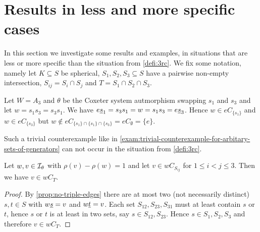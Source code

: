 \section{Results in less and more specific cases}
\label{sec:sec:main-thesis-less-more-specific}

%
%		

In this section we investigate some results and examples, in situations that are less or more specific than the situation from \ref{defi:3rc}. We fix some notation, namely let $K \subseteq S$ be spherical, $S_1,S_2,S_3 \subseteq S$ have a pairwise non-empty intersection, $S_{ij} = S_i \cap S_j$ and $T = S_1 \cap S_2 \cap S_3$.

\begin{exam}
	Let $W = A_3$ and $\theta$ be the Coxeter system autmorphism swapping $s_1$ and $s_3$ and let $w = s_1s_3 = s_3s_1$. We have $e \underline{s}_1 = s_3 s_1 = w = s_1 s_3 = e \underline{s}_3$. Hence $w \in eC_{\{s_1\}}$ and $w \in eC_{\{s_3\}}$ but $w \notin eC_{\{s_1\} \cap \{s_1\} \cap \{s_3\}} = eC_\emptyset = \{e\}$.
\end{exam}

Such a trivial counterexample like in \ref{exam:trivial-counterexample-for-arbitary-sets-of-generators} can not occur in the situation from \ref{defi:3rc}.

\begin{prop}
	Let $w,v \in \mathcal{I}_{\theta}$ with $\rho(v) - \rho(w) = 1$ and let $v \in w C_{S_{ij}}$ for $1 \leq i < j \leq 3$. Then we have $v \in wC_T$.

	\begin{proof}
		By \ref{prop:no-triple-edges} there are at most two (not necessarily distinct) $s,t \in S$ with $w \underline{s} = v$ and $w \underline{t} = v$. Each set $S_{12},S_{23},S_{31}$ must at least contain $s$ or $t$, hence $s$ or $t$ is at least in two sets, say $s \in S_{12},S_{23}$. Hence $s \in S_1,S_2,S_3$ and therefore $v \in wC_T$.
	\end{proof}
\end{prop}

